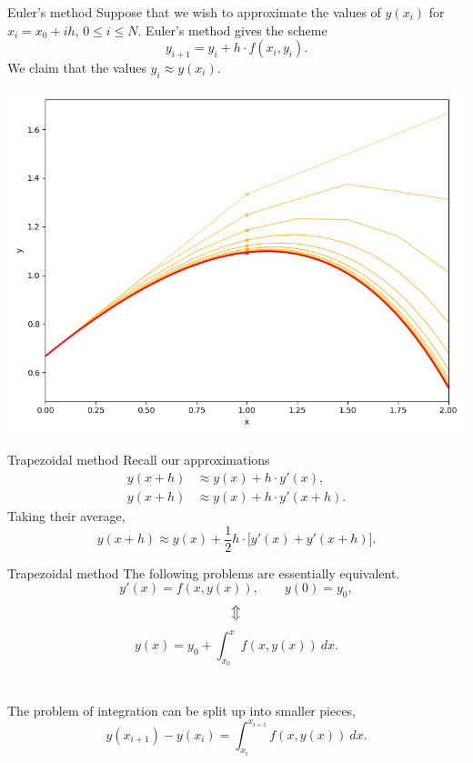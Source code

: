 \documentclass{beamer}
\begin{document}
    \begin{frame}{Euler's method}
        Suppose that we wish to approximate the values of $y(x_i)$ for $x_i = x_0 +
        ih$, $0 \leq i \leq N$. Euler's method gives the scheme \[
            y_{i + 1} = y_i + h\cdot f(x_i, y_i).
        \] We claim that the values $y_i \approx y(x_i)$.
    \end{frame}
    
    \begin{frame}[plain]
        \begin{center}
            \includegraphics[width=\textwidth]{./img/euler.png}
        \end{center}
    \end{frame}
    
    
    \begin{frame}{Trapezoidal method}
        Recall our approximations \begin{align*}
            y(x + h) &\approx y(x) + h\cdot y'(x), \\
            y(x + h) &\approx y(x) + h\cdot y'(x + h).
        \end{align*}
        Taking their average, \[
            y(x + h) \approx y(x) + \frac{1}{2}h\cdot \Big[y'(x) + y'(x + h)\Big].
        \]
    \end{frame}

    \begin{frame}{Trapezoidal method}
        The following problems are essentially equivalent.
        \[
            y'(x) = f(x, y(x)), \qquad y(0) = y_0,
        \] 
        \[ \big\Updownarrow \] 
        \[
            y(x) = y_0 + \int_{x_0}^x f(x, y(x))\:dx.
        \] \\~\\

        The problem of integration can be split up into smaller pieces,
        \[
            y(x_{i + 1}) - y(x_i) = \int_{x_i}^{x_{i + 1}} f(x, y(x))\:dx.
        \] 
    \end{frame}
\end{document}
